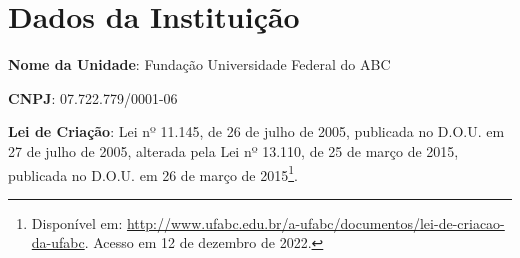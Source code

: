 
\section{Dados da Instituição}

\textbf{Nome da Unidade}: Fundação Universidade Federal do ABC

\textbf{CNPJ}: 07.722.779/0001-06

\textbf{Lei de Criação}: Lei nº 11.145, de 26 de julho de 2005, publicada no
D.O.U. em 27 de julho de 2005, alterada pela Lei nº 13.110, de 25 de março de
2015, publicada no D.O.U. em 26 de março de 2015\footnote{Disponível em:
\url{http://www.ufabc.edu.br/a-ufabc/documentos/lei-de-criacao-da-ufabc}.
Acesso em 12 de dezembro de 2022.}.
